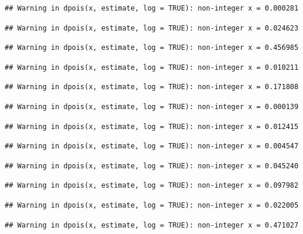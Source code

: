 \documentclass[]{article}
\begin{document}
\begin{verbatim}
## Warning in dpois(x, estimate, log = TRUE): non-integer x = 0.000281
\end{verbatim}

\begin{verbatim}
## Warning in dpois(x, estimate, log = TRUE): non-integer x = 0.024623
\end{verbatim}

\begin{verbatim}
## Warning in dpois(x, estimate, log = TRUE): non-integer x = 0.456985
\end{verbatim}

\begin{verbatim}
## Warning in dpois(x, estimate, log = TRUE): non-integer x = 0.010211
\end{verbatim}

\begin{verbatim}
## Warning in dpois(x, estimate, log = TRUE): non-integer x = 0.171808
\end{verbatim}

\begin{verbatim}
## Warning in dpois(x, estimate, log = TRUE): non-integer x = 0.000139
\end{verbatim}

\begin{verbatim}
## Warning in dpois(x, estimate, log = TRUE): non-integer x = 0.012415
\end{verbatim}

\begin{verbatim}
## Warning in dpois(x, estimate, log = TRUE): non-integer x = 0.004547
\end{verbatim}

\begin{verbatim}
## Warning in dpois(x, estimate, log = TRUE): non-integer x = 0.045240
\end{verbatim}

\begin{verbatim}
## Warning in dpois(x, estimate, log = TRUE): non-integer x = 0.097982
\end{verbatim}

\begin{verbatim}
## Warning in dpois(x, estimate, log = TRUE): non-integer x = 0.022005
\end{verbatim}

\begin{verbatim}
## Warning in dpois(x, estimate, log = TRUE): non-integer x = 0.471027
\end{verbatim}
\end{document}
